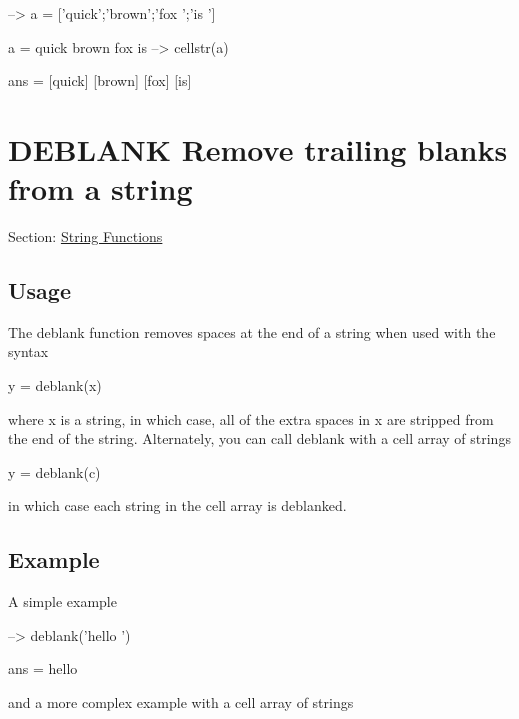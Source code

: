 \begin{DoxyVerbInclude}
--> a = ['quick';'brown';'fox  ';'is   ']

a = 
quick
brown
fox  
is   
--> cellstr(a)

ans = 
 [quick] 
 [brown] 
 [fox] 
 [is] 
\end{DoxyVerbInclude}
 \hypertarget{string_deblank}{}\section{D\-E\-B\-L\-A\-N\-K Remove trailing blanks from a string}\label{string_deblank}
Section\-: \hyperlink{sec_string}{String Functions} \hypertarget{vtkwidgets_vtkxyplotwidget_Usage}{}\subsection{Usage}\label{vtkwidgets_vtkxyplotwidget_Usage}
The {\ttfamily deblank} function removes spaces at the end of a string when used with the syntax \begin{DoxyVerb}   y = deblank(x)
\end{DoxyVerb}
 where {\ttfamily x} is a string, in which case, all of the extra spaces in {\ttfamily x} are stripped from the end of the string. Alternately, you can call {\ttfamily deblank} with a cell array of strings \begin{DoxyVerb}   y = deblank(c)
\end{DoxyVerb}
 in which case each string in the cell array is deblanked. \hypertarget{variables_struct_Example}{}\subsection{Example}\label{variables_struct_Example}
A simple example


\begin{DoxyVerbInclude}
--> deblank('hello   ')

ans = 
hello
\end{DoxyVerbInclude}


and a more complex example with a cell array of strings


